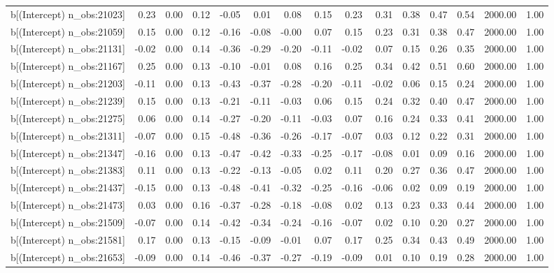 \begin{table}[ht]
\begin{tabular}{rrrrrrrrrrrrrrr}
  b[(Intercept) n\_obs:21023] & 0.23 & 0.00 & 0.12 & -0.05 & 0.01 & 0.08 & 0.15 & 0.23 & 0.31 & 0.38 & 0.47 & 0.54 & 2000.00 & 1.00 \\ 
  b[(Intercept) n\_obs:21059] & 0.15 & 0.00 & 0.12 & -0.16 & -0.08 & -0.00 & 0.07 & 0.15 & 0.23 & 0.31 & 0.38 & 0.47 & 2000.00 & 1.00 \\ 
  b[(Intercept) n\_obs:21131] & -0.02 & 0.00 & 0.14 & -0.36 & -0.29 & -0.20 & -0.11 & -0.02 & 0.07 & 0.15 & 0.26 & 0.35 & 2000.00 & 1.00 \\ 
  b[(Intercept) n\_obs:21167] & 0.25 & 0.00 & 0.13 & -0.10 & -0.01 & 0.08 & 0.16 & 0.25 & 0.34 & 0.42 & 0.51 & 0.60 & 2000.00 & 1.00 \\ 
  b[(Intercept) n\_obs:21203] & -0.11 & 0.00 & 0.13 & -0.43 & -0.37 & -0.28 & -0.20 & -0.11 & -0.02 & 0.06 & 0.15 & 0.24 & 2000.00 & 1.00 \\ 
  b[(Intercept) n\_obs:21239] & 0.15 & 0.00 & 0.13 & -0.21 & -0.11 & -0.03 & 0.06 & 0.15 & 0.24 & 0.32 & 0.40 & 0.47 & 2000.00 & 1.00 \\ 
  b[(Intercept) n\_obs:21275] & 0.06 & 0.00 & 0.14 & -0.27 & -0.20 & -0.11 & -0.03 & 0.07 & 0.16 & 0.24 & 0.33 & 0.41 & 2000.00 & 1.00 \\ 
  b[(Intercept) n\_obs:21311] & -0.07 & 0.00 & 0.15 & -0.48 & -0.36 & -0.26 & -0.17 & -0.07 & 0.03 & 0.12 & 0.22 & 0.31 & 2000.00 & 1.00 \\ 
  b[(Intercept) n\_obs:21347] & -0.16 & 0.00 & 0.13 & -0.47 & -0.42 & -0.33 & -0.25 & -0.17 & -0.08 & 0.01 & 0.09 & 0.16 & 2000.00 & 1.00 \\ 
  b[(Intercept) n\_obs:21383] & 0.11 & 0.00 & 0.13 & -0.22 & -0.13 & -0.05 & 0.02 & 0.11 & 0.20 & 0.27 & 0.36 & 0.47 & 2000.00 & 1.00 \\ 
  b[(Intercept) n\_obs:21437] & -0.15 & 0.00 & 0.13 & -0.48 & -0.41 & -0.32 & -0.25 & -0.16 & -0.06 & 0.02 & 0.09 & 0.19 & 2000.00 & 1.00 \\ 
  b[(Intercept) n\_obs:21473] & 0.03 & 0.00 & 0.16 & -0.37 & -0.28 & -0.18 & -0.08 & 0.02 & 0.13 & 0.23 & 0.33 & 0.44 & 2000.00 & 1.00 \\ 
  b[(Intercept) n\_obs:21509] & -0.07 & 0.00 & 0.14 & -0.42 & -0.34 & -0.24 & -0.16 & -0.07 & 0.02 & 0.10 & 0.20 & 0.27 & 2000.00 & 1.00 \\ 
  b[(Intercept) n\_obs:21581] & 0.17 & 0.00 & 0.13 & -0.15 & -0.09 & -0.01 & 0.07 & 0.17 & 0.25 & 0.34 & 0.43 & 0.49 & 2000.00 & 1.00 \\ 
  b[(Intercept) n\_obs:21653] & -0.09 & 0.00 & 0.14 & -0.46 & -0.37 & -0.27 & -0.19 & -0.09 & 0.01 & 0.10 & 0.19 & 0.28 & 2000.00 & 1.00 \\ 

\end{tabular}
\end{table}
